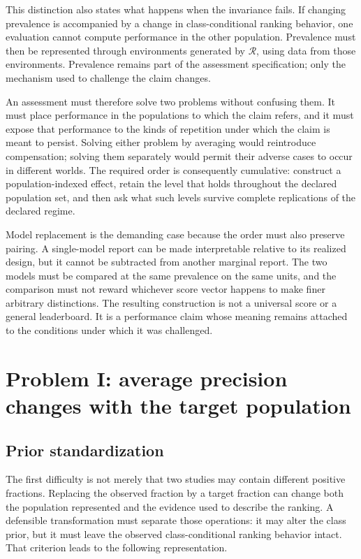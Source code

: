 \documentclass[11pt]{article}
\newcommand{\Regime}{\mathcal{R}}
\theoremstyle{remark}
\begin{document}
This distinction also states what happens when the invariance fails. If changing prevalence is accompanied by a change in class-conditional ranking behavior, one evaluation cannot compute performance in the other population. Prevalence must then be represented through environments generated by $\Regime$, using data from those environments. Prevalence remains part of the assessment specification; only the mechanism used to challenge the claim changes.

An assessment must therefore solve two problems without confusing them. It must place performance in the populations to which the claim refers, and it must expose that performance to the kinds of repetition under which the claim is meant to persist. Solving either problem by averaging would reintroduce compensation; solving them separately would permit their adverse cases to occur in different worlds. The required order is consequently cumulative: construct a population-indexed effect, retain the level that holds throughout the declared population set, and then ask what such levels survive complete replications of the declared regime.

Model replacement is the demanding case because the order must also preserve pairing. A single-model report can be made interpretable relative to its realized design, but it cannot be subtracted from another marginal report. The two models must be compared at the same prevalence on the same units, and the comparison must not reward whichever score vector happens to make finer arbitrary distinctions. The resulting construction is not a universal score or a general leaderboard. It is a performance claim whose meaning remains attached to the conditions under which it was challenged.

\section{Problem I: average precision changes with the target population}
\label{sec:prevalence}

\subsection{Prior standardization}

The first difficulty is not merely that two studies may contain different positive fractions. Replacing the observed fraction by a target fraction can change both the population represented and the evidence used to describe the ranking. A defensible transformation must separate those operations: it may alter the class prior, but it must leave the observed class-conditional ranking behavior intact. That criterion leads to the following representation.
\end{document}
